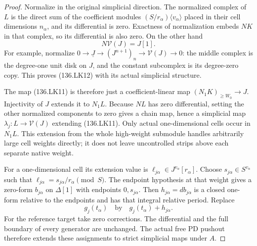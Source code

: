 \begin{proof}
Normalize in the original simplicial direction.  The normalized
complex of \(L\) is the direct sum of the coefficient modules
\((S/r_\alpha)\langle v_\alpha\rangle\) placed in their
cell dimensions \(n_\alpha\), and its differential is zero.
Exactness of normalization embeds \(NK\) in that complex,
so its differential is also zero.  On the other hand
\[
                         N\mathcal V(J)=J[1].
                                                               \tag{136.LK12}
\]
For example, normalize
\(0\to\underline J\to(J^{n+1})_n\to\mathcal V(J)\to0\):
the middle complex is the degree-one unit disk on \(J\),
and the constant subcomplex is its degree-zero copy.  This
proves (136.LK12) with its actual simplicial structure.

The map (136.LK11) is therefore just a coefficient-linear
map \((N_1K)_{\geq W_0}\to J\).  Injectivity of \(J\)
extends it to \(N_1L\).  Because \(NL\) has zero
differential, setting the other normalized components to zero
gives a chain map, hence a simplicial map
\(\lambda_j:L\to\mathcal V(J)\) extending (136.LK11).
Only actual one-dimensional cells occur in \(N_1L\).
This extension from the whole high-weight submodule handles
arbitrarily large cell weights directly; it does not leave
uncontrolled strips above each separate native weight.

For a one-dimensional cell its extension value is
\(\ell_{j\alpha}\in J^{v_\alpha}[r_\alpha]\).
Choose \(s_{j\alpha}\in S^{v_\alpha}\) such that
\(\ell_{j\alpha}=s_{j\alpha}/r_\alpha\pmod S\).
The endpoint hypothesis at that weight gives a zero-form
\(b_{j\alpha}\) on \(\Delta[1]\) with endpoints
\(0,s_{j\alpha}\).  Then
\(h_{j\alpha}=d b_{j\alpha}\) is a closed one-form
relative to the endpoints and has that integral relative period.
Replace
\[
             g_j(t_\alpha)\quad\text{by}\quad
                    g_j(t_\alpha)+h_{j\alpha}.
                                                               \tag{136.LK13}
\]
For the reference target take zero corrections.  The differential
and the full boundary of every generator are unchanged.
The actual free PD pushout therefore extends these assignments
to strict simplicial maps under \(A\).


\end{proof}
